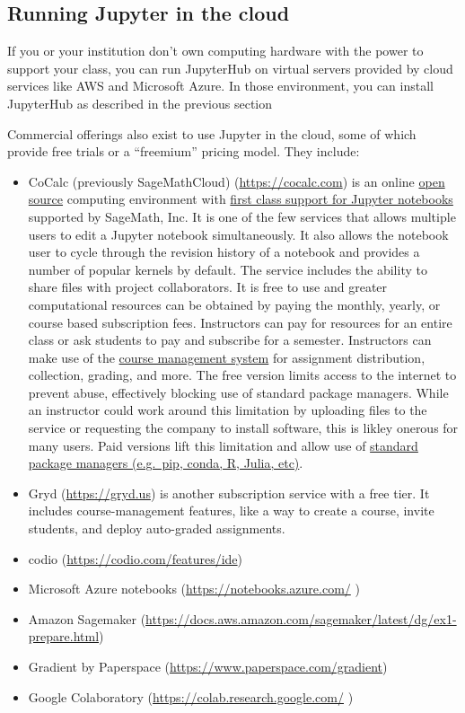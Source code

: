 \documentclass[]{book}
\begin{document}
\subsection{Running Jupyter in the
cloud}\label{running-jupyter-in-the-cloud}

If you or your institution don't own computing hardware with the power
to support your class, you can run JupyterHub on virtual servers
provided by cloud services like AWS and Microsoft Azure. In those
environment, you can install JupyterHub as described in the previous
section

Commercial offerings also exist to use Jupyter in the cloud, some of
which provide free trials or a ``freemium'' pricing model. They include:

\begin{itemize}
\item
  CoCalc (previously SageMathCloud) (\url{https://cocalc.com}) is an
  online \href{https://github.com/sagemathinc/}{open source} computing
  environment with
  \href{https://cocalc.com/doc/jupyter-notebook.html}{first class
  support for Jupyter notebooks} supported by SageMath, Inc. It is one
  of the few services that allows multiple users to edit a Jupyter
  notebook simultaneously. It also allows the notebook user to cycle
  through the revision history of a notebook and provides a number of
  popular kernels by default. The service includes the ability to share
  files with project collaborators. It is free to use and greater
  computational resources can be obtained by paying the monthly, yearly,
  or course based subscription fees. Instructors can pay for resources
  for an entire class or ask students to pay and subscribe for a
  semester. Instructors can make use of the
  \href{https://tutorial.cocalc.com/}{course management system} for
  assignment distribution, collection, grading, and more. The free
  version limits access to the internet to prevent abuse, effectively
  blocking use of standard package managers. While an instructor could
  work around this limitation by uploading files to the service or
  requesting the company to install software, this is likley onerous for
  many users. Paid versions lift this limitation and allow use of
  \href{https://github.com/sagemathinc/cocalc/wiki/How-to-Install-Python-Packages-into-CoCalc}{standard
  package managers (e.g.~pip, conda, R, Julia, etc)}.
\item
  Gryd (\url{https://gryd.us}) is another subscription service with a
  free tier. It includes course-management features, like a way to
  create a course, invite students, and deploy auto-graded assignments.
\item
  codio (\url{https://codio.com/features/ide})
\item
  Microsoft Azure notebooks (\url{https://notebooks.azure.com/} )
\item
  Amazon Sagemaker
  (\url{https://docs.aws.amazon.com/sagemaker/latest/dg/ex1-prepare.html})
\item
  Gradient by Paperspace (\url{https://www.paperspace.com/gradient})
\item
  Google Colaboratory (\url{https://colab.research.google.com/} )
\end{itemize}
\end{document}
